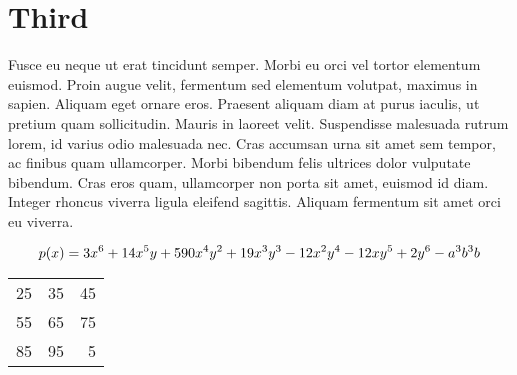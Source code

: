 \documentclass{scrartcl}
\begin{document}
\section{Third}
Fusce eu neque ut erat tincidunt semper. Morbi eu orci vel tortor elementum euismod. Proin augue velit, fermentum sed elementum volutpat, maximus in sapien. Aliquam eget ornare eros. Praesent aliquam diam at purus iaculis, ut pretium quam sollicitudin. Mauris in laoreet velit. Suspendisse malesuada rutrum lorem, id varius odio malesuada nec. Cras accumsan urna sit amet sem tempor, ac finibus quam ullamcorper. Morbi bibendum felis ultrices dolor vulputate bibendum. Cras eros quam, ullamcorper non porta sit amet, euismod id diam. Integer rhoncus viverra ligula eleifend sagittis. Aliquam fermentum sit amet orci eu viverra.


\begin{equation}
p(x) = 3x^6 + 14x^5y + 590x^4y^2 + 19x^3y^3\\ 
- 12x^2y^4 - 12xy^5 + 2y^6 - a^3b^3b 
\end{equation} 


\begin{center}
\begin{tabular}{ l | c | r }
  \hline			
  25 & 35 & 45 \\
  55 & 65 & 75 \\
  85 & 95 & 5 \\
  \hline  
\end{tabular}
\end{center}
\end{document}

